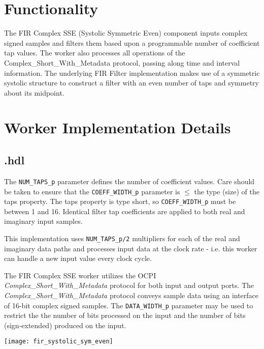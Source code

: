 \section*{Functionality}
\begin{flushleft}
	The FIR Complex SSE (Systolic Symmetric Even) component inputs complex signed samples and filters them based upon a programmable number of coefficient tap values. The worker also processes all operations of the Complex\_Short\_With\_Metadata protocol, passing along time and interval information. The underlying FIR Filter implementation makes use of a symmetric systolic structure to construct a filter with an even number of taps and symmetry about its midpoint.
\end{flushleft}

\section*{Worker Implementation Details}
\subsection*{\comp.hdl}
\begin{flushleft}
	The \verb+NUM_TAPS_p+ parameter defines the number of coefficient values. Care should be taken to ensure that the \verb+COEFF_WIDTH_p+ parameter is $\le$ the type (size) of the taps property. The taps property is type short, so \verb+COEFF_WIDTH_p+ must be between 1 and 16. Identical filter tap coefficients are applied to both real and imaginary input samples.\medskip

	This implementation uses \verb+NUM_TAPS_p/2+ multipliers for each of the real and imaginary data paths and processes input data at the clock rate - i.e. this worker can handle a new input value every clock cycle.\medskip
	
	The FIR Complex SSE worker utilizes the OCPI \textit{Complex\_Short\_With\_Metadata} protocol for both input and output ports. The \textit{Complex\_Short\_With\_Metadata} protocol conveys sample data using an interface of 16-bit complex signed samples. The \verb+DATA_WIDTH_p+ parameter may be used to restrict the the number of bits processed on the input and the number of bits (sign-extended) produced on the input.
\end{flushleft}
{\centering\captionsetup{type=figure}\texttt{[image: fir\_systolic\_sym\_even]}\par{}\label{fig:circuit}}

